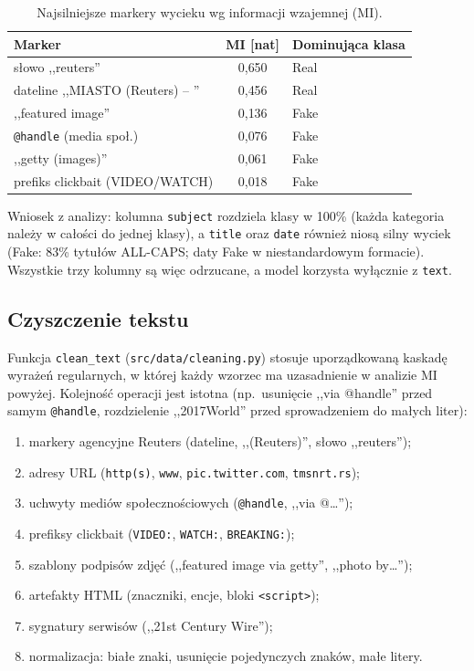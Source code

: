 \begin{table}[H]
  \centering
  \caption{Najsilniejsze markery wycieku wg informacji wzajemnej (MI).}
  \label{tab:leakage}
  \begin{tabular}{lcl}
    \toprule
    \textbf{Marker} & \textbf{MI [nat]} & \textbf{Dominująca klasa} \\
    \midrule
    słowo ,,reuters''            & 0{,}650 & Real \\
    dateline ,,MIASTO (Reuters) -- '' & 0{,}456 & Real \\
    ,,featured image''           & 0{,}136 & Fake \\
    \texttt{@handle} (media społ.)& 0{,}076 & Fake \\
    ,,getty (images)''           & 0{,}061 & Fake \\
    prefiks clickbait (VIDEO/WATCH) & 0{,}018 & Fake \\
    \bottomrule
  \end{tabular}
\end{table}

Wniosek z analizy: kolumna \texttt{subject} rozdziela klasy w 100\% (każda kategoria
należy w całości do jednej klasy), a \texttt{title} oraz \texttt{date} również niosą
silny wyciek (Fake: 83\% tytułów ALL-CAPS; daty Fake w niestandardowym formacie).
Wszystkie trzy kolumny są więc odrzucane, a model korzysta wyłącznie z \texttt{text}.

\subsection{Czyszczenie tekstu}

Funkcja \texttt{clean\_text} (\texttt{src/data/cleaning.py}) stosuje uporządkowaną
kaskadę wyrażeń regularnych, w której każdy wzorzec ma uzasadnienie w analizie MI powyżej.
Kolejność operacji jest istotna (np.\ usunięcie ,,via @handle'' przed samym
\texttt{@handle}, rozdzielenie ,,2017World'' przed sprowadzeniem do małych liter):

\begin{enumerate}[noitemsep]
  \item markery agencyjne Reuters (dateline, ,,(Reuters)'', słowo ,,reuters'');
  \item adresy URL (\texttt{http(s)}, \texttt{www}, \texttt{pic.twitter.com}, \texttt{tmsnrt.rs});
  \item uchwyty mediów społecznościowych (\texttt{@handle}, ,,via @\dots'');
  \item prefiksy clickbait (\texttt{VIDEO:}, \texttt{WATCH:}, \texttt{BREAKING:});
  \item szablony podpisów zdjęć (,,featured image via getty'', ,,photo by\dots'');
  \item artefakty HTML (znaczniki, encje, bloki \texttt{<script>});
  \item sygnatury serwisów (,,21st Century Wire'');
  \item normalizacja: białe znaki, usunięcie pojedynczych znaków, małe litery.
\end{enumerate}

